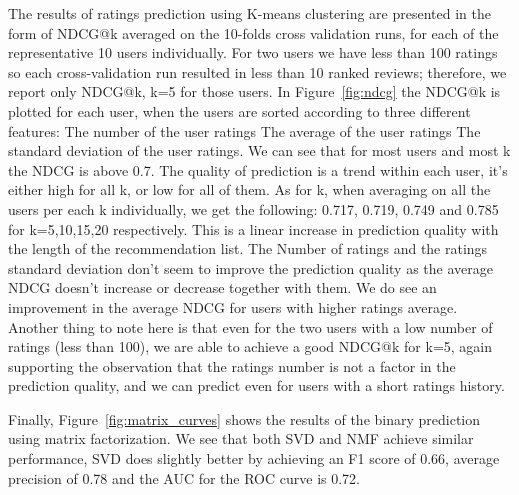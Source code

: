 The results of ratings prediction using K-means clustering are presented in the form of NDCG@k averaged on the 10-folds cross validation runs, for each of the representative 10 users individually. For two users we have less than 100 ratings so each cross-validation run resulted in less than 10 ranked reviews; therefore, we report only NDCG@k, k=5 for those users. In Figure~\ref{fig:ndcg} the NDCG@k is plotted for each user, when the users are sorted according to three different features: \blackone The number of the user ratings \blacktwo The average of the user ratings \blackthree The standard deviation of the user ratings. We can see that for most users and most k the NDCG is above 0.7. The quality of prediction is a trend within each user, it's either high for all k, or low for all of them. As for k, when averaging on all the users per each k individually, we get the following: 0.717, 0.719, 0.749 and 0.785 for k=5,10,15,20 respectively. This is a linear increase in prediction quality with the length of the recommendation list. The Number of ratings and the ratings standard deviation don't seem to improve the prediction quality as the average NDCG doesn't increase or decrease together with them. We do see an improvement in the average NDCG for users with higher ratings average. Another thing to note here is that even for the two users with a low number of ratings (less than 100), we are able to achieve a good NDCG@k for k=5, again supporting the observation that the ratings number is not a factor in the prediction quality, and we can predict even for users with a short ratings history. 


Finally, Figure~\ref{fig:matrix_curves} shows the results of the binary prediction using matrix factorization. 
We see that both SVD and NMF achieve similar performance, SVD does slightly better by achieving an F1 score of 0.66, average precision of 0.78 and the AUC for the ROC curve is 0.72.
